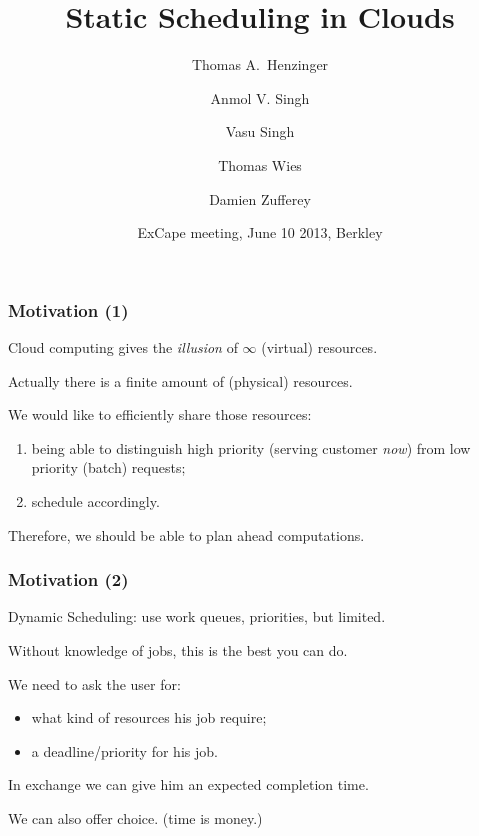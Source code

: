 \documentclass{beamer}
\title[Static Scheduling in Clouds]{Static Scheduling in Clouds}
\author[Damien Zufferey]{
  Thomas A.~Henzinger \and
  Anmol V. Singh \and
  Vasu Singh \and
  Thomas Wies \and
  \alert{Damien Zufferey}
}
\institute{ IST Austria }
\date{ExCape meeting, June 10 2013, Berkley}
\begin{document}
\frame[plain]{\titlepage}

\begin{frame}
  \frametitle{Motivation (1)}
  Cloud computing gives the \emph{illusion} of $\infty$ (virtual) resources.

  \vspace{2ex}
  
  Actually there is a finite amount of (physical) resources.

  \vspace{2ex}
  
  We would like to efficiently share those resources:
  \begin{enumerate}
  \item being able to distinguish high priority (serving customer \emph{now}) from low priority (batch) requests;
  \item schedule accordingly.
  \end{enumerate}
  
  \vspace{2ex}
  
  Therefore, we should be able to \alert{plan ahead} computations.

\end{frame}

\begin{frame}
  \frametitle{Motivation (2)}

  Dynamic Scheduling: use work queues, priorities, but limited.

  \vspace{2ex}
  
  Without knowledge of jobs, this is the best you can do.

  \vspace{1cm}
  
  We need to ask the user for:
  \begin{itemize}
  \item what kind of resources his job require;
  \item a deadline/priority for his job.
  \end{itemize}

  \vspace{2ex}
  
  In exchange we can give him an expected completion time.

  \vspace{1cm}

  We can also offer choice. (time is money.)
  
\end{frame}
\end{document}
